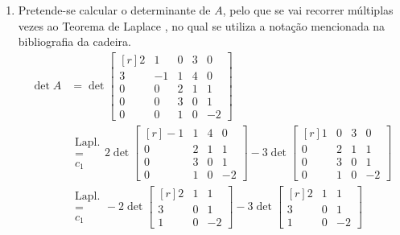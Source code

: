 \begin{enumerate}[label=\alph*.]
	\item
		Pretende-se calcular o determinante de $A$, pelo que se vai recorrer
		múltiplas vezes ao Teorema de Laplace
		\parencite[pág. 129, Proposiçãp 3.9, Teorema de Laplace]{Cabral2012},
		no qual se utiliza a notação mencionada na bibliografia da cadeira.
		\begin{align*}
			\det A
			&=
			\det
			\begin{bmatrix*}[r]
				2 & 1 & 0 & 3 & 0\\
				3 & -1 & 1 & 4 & 0\\
				0 & 0 & 2 & 1 & 1\\
				0 & 0 & 3 & 0 & 1\\
				0 & 0 & 1 & 0 & -2
			\end{bmatrix*}\\
			&
			\begin{matrix}
				\text{Lapl.}\\
				=\\
				c_1
			\end{matrix}
			2
			\det
			\begin{bmatrix*}[r]
				-1 & 1 & 4 & 0\\
				0 & 2 & 1 & 1\\
				0 & 3 & 0 & 1\\
				0 & 1 & 0 & -2
			\end{bmatrix*}
			-
			3
			\det
			\begin{bmatrix*}[r]
				1 & 0 & 3 & 0\\
				0 & 2 & 1 & 1\\
				0 & 3 & 0 & 1\\
				0 & 1 & 0 & -2
			\end{bmatrix*}\\
			&
			\begin{matrix}
				\text{Lapl.}\\
				=\\
				c_1
			\end{matrix}
			-2
			\det
			\begin{bmatrix*}[r]
				2 & 1 & 1\\
				3 & 0 & 1\\
				1 & 0 & -2
			\end{bmatrix*}
			-
			3
			\det
			\begin{bmatrix*}[r]
				2 & 1 & 1\\
				3 & 0 & 1\\
				1 & 0 & -2
			\end{bmatrix*}\\

\end{align*}
\end{enumerate}

